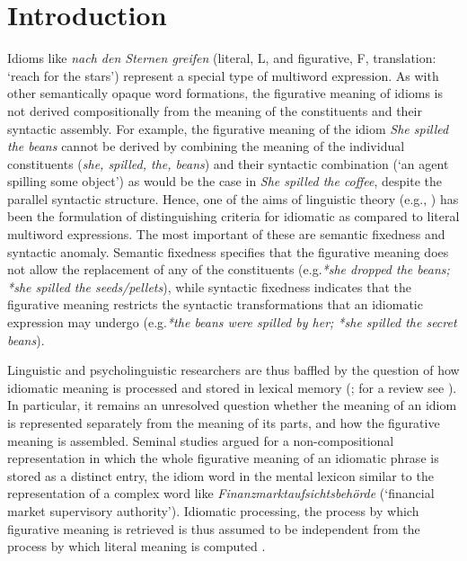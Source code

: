 \documentclass[output=paper]{langsci/langscibook}
\author{Eva Smolka\affiliation{University of Konstanz, Germany}\lastand Carsten Eulitz\affiliation{University of Konstanz, Germany}}
\begin{document}
\maketitle

\section{Introduction}   

Idioms like \textit{nach den Sternen greifen} (literal, L, and figurative, F, translation: ‘reach for the stars’) represent a special type of multiword expression. As with other semantically opaque word formations, the figurative meaning of idioms is not derived compositionally from the meaning of the constituents and their syntactic assembly. For example, the figurative meaning of the idiom \textit{She spilled the beans} cannot be derived by combining the meaning of the individual constituents (\textit{she, spilled, the, beans}) and their syntactic combination (‘an agent spilling some object’) as would be the case in \textit{She spilled the coffee}, despite the parallel syntactic structure. Hence, one of the aims of linguistic theory (e.g., \citealt{grice:1975,grice:1978}) has been the formulation of distinguishing criteria for idiomatic as compared to literal multiword expressions. The most important of these are semantic fixedness and syntactic anomaly. Semantic fixedness specifies that the figurative meaning does not allow the replacement of any of the constituents (e.g.\textit{*she dropped the beans; *she spilled the seeds/pellets}), while syntactic fixedness indicates that the figurative meaning restricts the syntactic transformations that an idiomatic expression may undergo (e.g.\textit{*the beans were spilled by her; *she spilled the secret beans}).


Linguistic and psycholinguistic researchers are thus baffled by the question of how idiomatic meaning is processed and stored in lexical memory (\citealt{burger:2003,burger:2004,cacciari:1994,gibbs:1994,gibbs:2002,swinney:1979}; for a review see \citealt{titone:1999,titone:2014}). In particular, it remains an unresolved question whether the meaning of an idiom is represented separately from the meaning of its parts, and how the figurative meaning is assembled. Seminal studies argued for a non-compositional representation in which the whole figurative meaning of an idiomatic phrase is stored as a distinct entry, the idiom word in the mental lexicon similar to the representation of a complex word like \textit{Finanzmarktaufsichtsbehörde} (‘financial market supervisory authority’). Idiomatic processing, the process by which figurative meaning is retrieved is thus assumed to be independent from the process by which literal meaning is computed \citep{bobrow:1973,gibbs:1980,swinney:1979}. 
\end{document}
